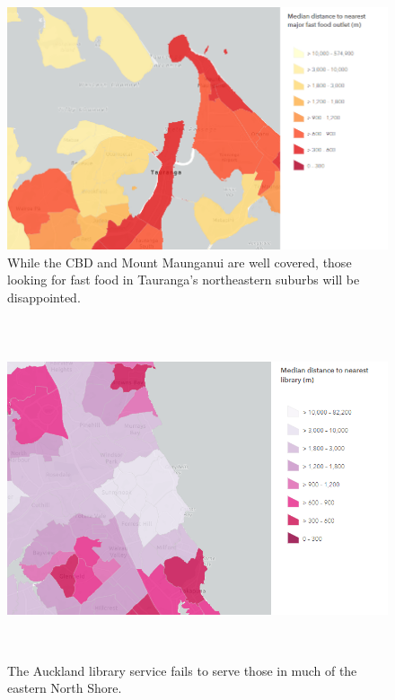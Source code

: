 \documentclass[12pt,a4paper]{article}
\begin{document}
\begin{figure}[!htbp]
	\begin{center}
		\includegraphics[width=170mm]{./figures/tauranga_fast_food.png}
		\caption{\centering While the CBD and Mount Maunganui are well covered, those looking for fast food in Tauranga's northeastern suburbs will be disappointed.}
		\label{fig:tauranga_ff}
	\end{center}
\end{figure}


\begin{figure}[!htbp]
	\begin{center}
		\includegraphics[height=100mm]{./figures/north_shore_libraries.png}
		\caption{\centering The Auckland library service fails to serve those in much of the eastern North Shore.}
		\label{fig:akl_libraries}
	\end{center}
\end{figure}
\end{document}

